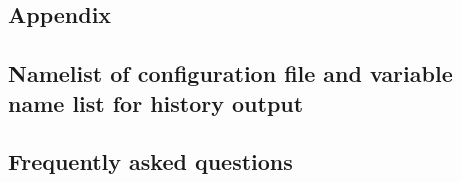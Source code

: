 \documentclass[a4paper]{report}
\begin{document}



\begin{appendix}
\part{Appendix}
\chapter{Namelist of configuration file and variable name list for history output} \label{achap:namelist}

\chapter{Frequently asked questions} \label{achap:practice}


\end{appendix}


\ClearWallPaper

\end{document}
